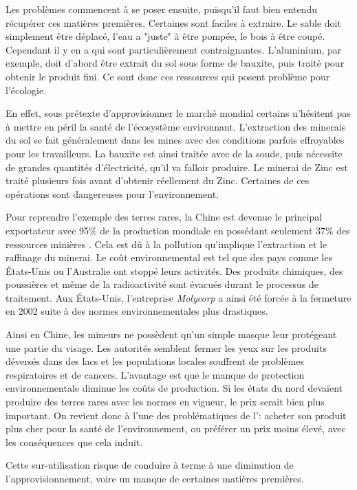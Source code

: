Les problèmes commencent à se poser ensuite, puisqu'il faut bien entendu récupérer ces matières premières. Certaines sont faciles à extraire. Le sable doit simplement être déplacé, l'eau a "juste" à être pompée, le bois à être coupé. Cependant il y en a qui sont particulièrement contraignantes. L'aluminium, par exemple, doit d'abord être extrait du sol sous forme de bauxite, puis traité pour obtenir le produit fini. Ce sont donc ces ressources qui posent problème pour l'écologie.

En effet, sous prétexte d'approvisionner le marché mondial certains n'hésitent pas à mettre en péril la santé de l'écosystème environnant. L'extraction des minerais du sol se fait généralement dans les mines avec des conditions parfois effroyables pour les travailleurs. La bauxite est ainsi traitée avec de la soude, puis nécessite de grandes quantités d’électricité, qu'il va falloir produire. Le minerai de Zinc est traité plusieurs fois avant d'obtenir réellement du Zinc. Certaines de ces opérations sont dangereuses pour l'environnement.

\bigbreak
Pour reprendre l'exemple des terres rares, la Chine est devenue le principal exportateur avec 95\% de la production mondiale en possédant seulement 37\% des ressources minières \cite{MongolieChine}. Cela est dû à la pollution qu'implique l'extraction et le raffinage du minerai. Le coût environnemental est tel que des pays comme les États-Unis ou l'Australie ont stoppé leurs activités. Des produits chimiques, des poussières et même de la radioactivité sont évacués durant le processus de traitement. Aux États-Unis, l'entreprise \textit{Molycorp} a ainsi été forcée à la fermeture en 2002 suite à des normes environnementales plus drastiques.

Ainsi en Chine, les mineurs ne possèdent qu'un simple masque leur protégeant une partie du visage. Les autorités semblent fermer les yeux sur les produits déversés dans des lacs et les populations locales souffrent de problèmes respiratoires et de cancers. L'avantage est que le manque de protection environnementale diminue les coûts de production. Si les états du nord devaient produire des terres rares avec les normes en vigueur, le prix serait bien plus important. On revient donc à l'une des problématiques de l'\op : acheter son produit plus cher pour la santé de l'environnement, ou préférer un prix moins élevé, avec les conséquences que cela induit.


\bigbreak Cette sur-utilisation risque de conduire à terme à une diminution de l'approvisionnement, voire un manque de certaines matières premières.


